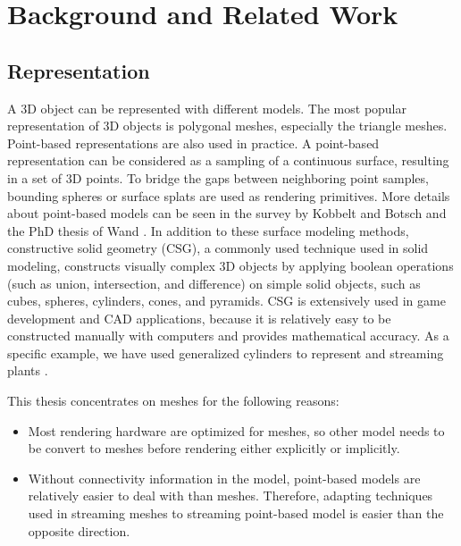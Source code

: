 \chapter{Background and Related Work}
\label{c:related}
    \section{Representation}
    \label{s:related:representation}
    A 3D object can be represented with different models.
    The most popular representation of 3D objects is polygonal meshes, 
    especially the triangle meshes.
    Point-based representations are also used in practice.
    A point-based representation can be considered as a 
    sampling of a continuous surface, resulting in a set of 3D points. 
    To bridge the gaps between neighboring point samples, 
    bounding spheres \cite{rusinkiewicz:qsplat, 364350} or surface splats \cite{383300} are used as rendering primitives. 
    More details about point-based models can be seen in the survey by Kobbelt and Botsch \cite{DBLP:journals/cg/KobbeltB04} 
    and the PhD thesis of Wand \cite{wand:point}.  
    In addition to these surface modeling methods, 
    constructive solid geometry (CSG), a commonly used technique used in solid modeling, 
    constructs visually complex 3D objects by applying boolean operations
    (such as union, intersection, and difference) on simple solid objects,
    such as cubes, spheres, cylinders, cones, and  pyramids. 
    CSG is extensively used in game development and CAD applications, because it is 
    relatively easy to be constructed manually with computers and provides mathematical accuracy. 
    As a specific example, we have used generalized cylinders to represent and streaming plants 
    \cite{plant:seb, compact:mondet}.

    This thesis concentrates on meshes for the following reasons:
    \begin{itemize}
        \item Most rendering hardware are optimized for meshes, so other model needs to be convert
            to meshes before rendering either explicitly or implicitly. 
        \item Without connectivity information in the model, point-based models are relatively easier to deal with
            than meshes. Therefore, adapting techniques used in streaming meshes to streaming point-based model
            is easier than the opposite direction.
    \end{itemize}
    
